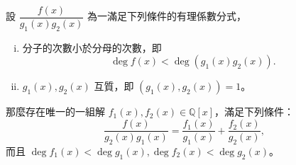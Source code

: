 \begin{theorem}\label{thm:partial_fractions}
設 $\dfrac{f(x)}{g_1(x)g_2(x)}$ 為一滿足下列條件的有理係數分式，
\begin{enumerate}[(i)]
  \item 分子的次數小於分母的次數，即
  \begin{equation*}
    \deg f(x) < \deg(g_1(x)g_2(x)).
  \end{equation*}
  \item $g_1(x), g_2(x)$ 互質，即 $(g_1(x), g_2(x)) = 1$。
\end{enumerate}
那麼存在唯一的一組解 $f_1(x), f_2(x) \in \mathbb{Q}[x]$，滿足下列條件：
\begin{equation*}
  \frac{f(x)}{g_2(x)g_1(x)} = \frac{f_1(x)}{g_1(x)} + \frac{f_2(x)}{g_2(x)},
\end{equation*}
而且 $\deg f_1(x) < \deg g_1(x), \deg f_2(x) < \deg g_2(x)$。
\end{theorem}

